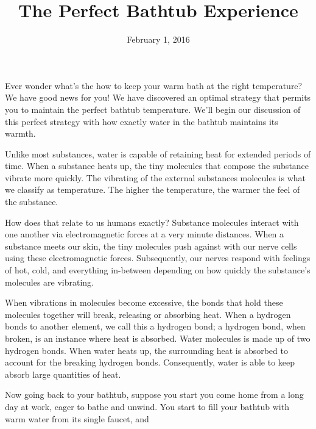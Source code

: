 \documentclass[12pt]{article}
\title{The Perfect Bathtub Experience}
\date{February 1, 2016}
\begin{document}
\maketitle

    Ever wonder what's the how to keep your warm bath at the right temperature? We have good news for you! We have discovered an optimal strategy that permits you to maintain the perfect bathtub temperature. We'll begin our discussion of this perfect strategy with how exactly water in the bathtub maintains its warmth.

	Unlike most substances, water is capable of retaining heat for extended periods of time. When a substance heats up, the tiny molecules that compose the substance vibrate more quickly. The vibrating of the external substances molecules is what we classify as temperature. The higher the temperature, the warmer the feel of the substance. 
	
	How does that relate to us humans exactly? Substance molecules interact with one another via electromagnetic forces at a very minute distances. When a substance meets our skin, the tiny molecules push against with our nerve cells using these electromagnetic forces. Subsequently, our nerves respond with feelings of hot, cold, and everything in-between depending on how quickly the substance's molecules are vibrating.
	
	When vibrations in molecules become excessive, the bonds that hold these molecules together will break, releasing or absorbing heat. When a hydrogen bonds to another element, we call this a hydrogen bond; a hydrogen bond, when broken, is an instance where heat is absorbed. Water molecules is made up of two hydrogen bonds. When water heats up, the surrounding heat is absorbed to account for the breaking hydrogen bonds. Consequently, water is able to keep absorb large quantities of heat. 
	
	Now going back to your bathtub, suppose you start you come home from a long day at work, eager to bathe and unwind. You start to fill your bathtub with warm water from its single faucet, and 
	
	
\end{document}
